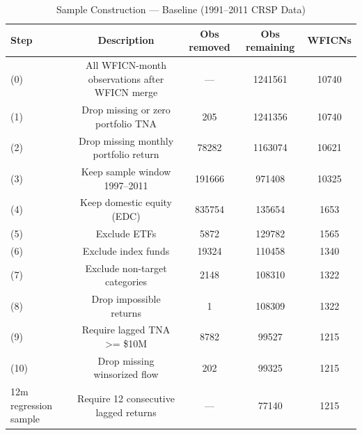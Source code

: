 \begin{table}[htbp]
\centering
\caption{Sample Construction --- Baseline (1991--2011 CRSP Data)}
\label{tab:sample_construction_baseline}
\small
\begin{tabular}{lcccc}
\toprule
Step & Description & Obs removed & Obs remaining & WFICNs \\
\midrule
(0) & All WFICN-month observations after WFICN merge & — & 1241561 & 10740 \\
(1) & Drop missing or zero portfolio TNA & 205 & 1241356 & 10740 \\
(2) & Drop missing monthly portfolio return & 78282 & 1163074 & 10621 \\
(3) & Keep sample window 1997–2011 & 191666 & 971408 & 10325 \\
(4) & Keep domestic equity (EDC) & 835754 & 135654 & 1653 \\
(5) & Exclude ETFs & 5872 & 129782 & 1565 \\
(6) & Exclude index funds & 19324 & 110458 & 1340 \\
(7) & Exclude non-target categories & 2148 & 108310 & 1322 \\
(8) & Drop impossible returns & 1 & 108309 & 1322 \\
(9) & Require lagged TNA >= \$10M & 8782 & 99527 & 1215 \\
(10) & Drop missing winsorized flow & 202 & 99325 & 1215 \\
12m regression sample & Require 12 consecutive lagged returns & — & 77140 & 1215 \\
\bottomrule
\end{tabular}
\end{table}
